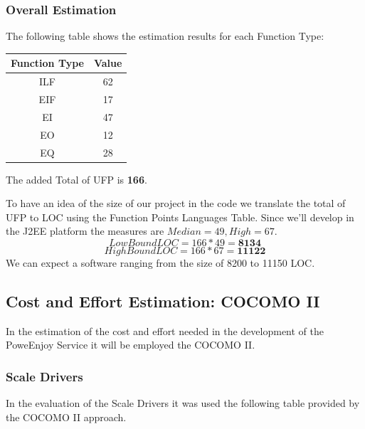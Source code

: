 \documentclass[a4paper]{article}
\begin{document}
\subsubsection{Overall Estimation}
 The following table shows the estimation results for each Function Type:
\begin{center}
\begin{tabular}{ | c | c | }
\hline
	\textbf{Function Type} & \textbf{Value}\\ \hline\hline
	ILF & 62 \\ \hline
	EIF & 17 \\ \hline
	EI & 47 \\ \hline
	EO & 12 \\ \hline
	EQ & 28 \\ \hline
\end{tabular}
\end{center}
The added Total of UFP is \textbf{166}.\newline
\par
To have an idea of the size of our project in the code we translate the total of UFP to LOC using the Function Points Languages Table. Since we'll develop in the J2EE platform the measures are \(Median = 49, High = 67\).
\[Low Bound LOC = 166 * 49 = \textbf{8134}\]
\[High Bound LOC = 166 * 67 = \textbf{11122}\]
We can expect a software ranging from the size of 8200 to 11150 LOC.
\newpage
\subsection{Cost and Effort Estimation: COCOMO II}
In the estimation of the cost and effort needed in the development of the PoweEnjoy Service it will be employed the COCOMO II.
\subsubsection{Scale Drivers}
In the evaluation of the Scale Drivers it was used the following table provided by the COCOMO II approach.
\end{document}
